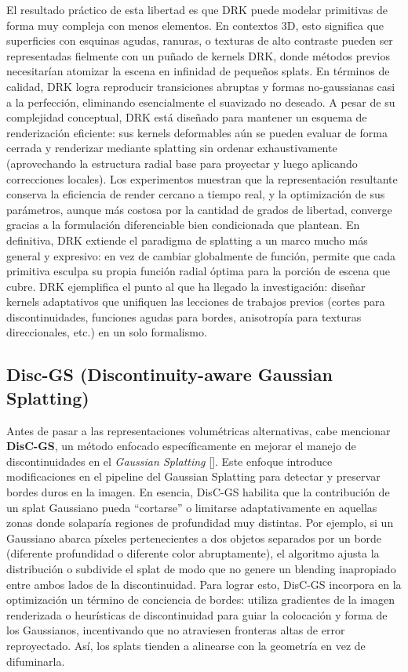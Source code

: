 El resultado práctico de esta libertad es que DRK puede modelar primitivas de forma muy compleja con menos elementos. En contextos 3D, esto significa que superficies con esquinas agudas, ranuras, o texturas de alto contraste pueden ser representadas fielmente con un puñado de kernels DRK, donde métodos previos necesitarían atomizar la escena en infinidad de pequeños splats. En términos de calidad, DRK logra reproducir transiciones abruptas y formas no-gaussianas casi a la perfección, eliminando esencialmente el suavizado no deseado. A pesar de su complejidad conceptual, DRK está diseñado para mantener un esquema de renderización eficiente: sus kernels deformables aún se pueden evaluar de forma cerrada y renderizar mediante splatting sin ordenar exhaustivamente (aprovechando la estructura radial base para proyectar y luego aplicando correcciones locales). Los experimentos muestran que la representación resultante conserva la eficiencia de render cercano a tiempo real, y la optimización de sus parámetros, aunque más costosa por la cantidad de grados de libertad, converge gracias a la formulación diferenciable bien condicionada que plantean. En definitiva, DRK extiende el paradigma de splatting a un marco mucho más general y expresivo: en vez de cambiar globalmente de función, permite que cada primitiva esculpa su propia función radial óptima para la porción de escena que cubre. DRK ejemplifica el punto al que ha llegado la investigación: diseñar kernels adaptativos que unifiquen las lecciones de trabajos previos (cortes para discontinuidades, funciones agudas para bordes, anisotropía para texturas direccionales, etc.) en un solo formalismo.

\subsection{Disc-GS (Discontinuity-aware Gaussian Splatting)}

Antes de pasar a las representaciones volumétricas alternativas, cabe mencionar \textbf{DisC-GS}, un método enfocado específicamente en mejorar el manejo de discontinuidades en el \textit{Gaussian Splatting} [\cite{qu2024discgsdiscontinuityawaregaussiansplatting}]. Este enfoque introduce modificaciones en el pipeline del Gaussian Splatting para detectar y preservar bordes duros en la imagen. En esencia, DisC-GS habilita que la contribución de un splat Gaussiano pueda “cortarse” o limitarse adaptativamente en aquellas zonas donde solaparía regiones de profundidad muy distintas. Por ejemplo, si un Gaussiano abarca píxeles pertenecientes a dos objetos separados por un borde (diferente profundidad o diferente color abruptamente), el algoritmo ajusta la distribución o subdivide el splat de modo que no genere un blending inapropiado entre ambos lados de la discontinuidad. Para lograr esto, DisC-GS incorpora en la optimización un término de conciencia de bordes: utiliza gradientes de la imagen renderizada o heurísticas de discontinuidad para guiar la colocación y forma de los Gaussianos, incentivando que no atraviesen fronteras altas de error reproyectado. Así, los splats tienden a alinearse con la geometría en vez de difuminarla.


